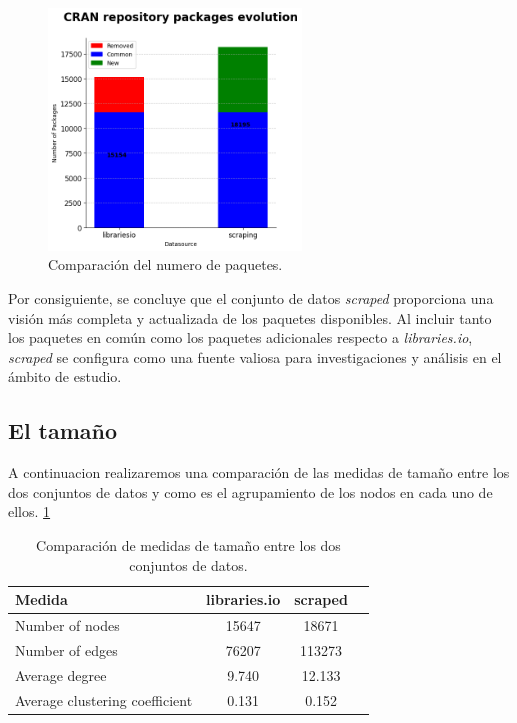 \begin{figure}[ht!]
    \begin{center}
        \includegraphics[width=0.6\textwidth]{img/cran/bars.png}
        \caption{Comparación del numero de paquetes.}
        \label{fig:cran_common_packages3}
    \end{center}
\end{figure}

Por consiguiente, se concluye que el conjunto de datos \textit{scraped} proporciona una
visión más completa y actualizada de los paquetes disponibles. Al incluir tanto los paquetes
en común como los paquetes adicionales respecto a \textit{libraries.io}, \textit{scraped}
se configura como una fuente valiosa para investigaciones y análisis en el ámbito de estudio.


\subsection{El tamaño}

A continuacion realizaremos una comparación de las medidas de tamaño entre los dos conjuntos de datos y como es
el agrupamiento de los nodos en cada uno de ellos. \ref{tab:cran_size}

\begin{table}[ht!]
    \begin{center}
        \begin{tabular}{|l|c|c|c|}
            \hline
            \textbf{Medida}                & \textbf{libraries.io} & \textbf{scraped} \\
            \hline
            Number of nodes                & 15647                 & 18671            \\
            Number of edges                & 76207                 & 113273           \\
            Average degree                 & 9.740                 & 12.133           \\
            Average clustering coefficient & 0.131                 & 0.152            \\
            \hline
        \end{tabular}
        \caption{Comparación de medidas de tamaño entre los dos conjuntos de datos.}
        \label{tab:cran_size}
    \end{center}
\end{table}

